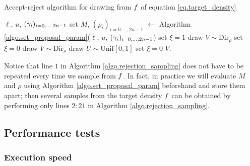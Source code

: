 \documentclass[10pt]{article}
\begin{document}
\begin{algorithm}
 \caption{Accept-reject algorithm for drawing from $f$ of equation \eqref{eq.target_density}}
 \label{algo.rejection_sampling}
 \begin{algorithmic}[5]
  \REQUIRE $\ell$, $u$, $(\gamma_i)_{i=0,\dots,2n-1}$
  \STATE set $M$, $(\rho_i)_{i=0,\dots,2n-1}$ $\leftarrow$ Algorithm \ref{algo.set_proposal_param}($\ell$, $u$, $(\gamma_i)_{i=0,\dots,2n-1}$)
  \STATE set $\xi = 1$
  \STATE draw $V\sim\text{Dir}_{\rho}$
  \STATE set $\xi=0$
  \ENDIF
  \ENDWHILE
  \ELSE
  \STATE draw $V\sim\text{Dir}_{\rho}$
  \STATE draw $U\sim \text{Unif}[0,1]$
  \STATE set $\xi = 0$
  \ENDIF
  \ENDIF
  \ENDWHILE
  \ENDIF
  \RETURN $V$.
 \end{algorithmic}
\end{algorithm}
\begin{remark}
 Notice that line $1$ in Algorithm \ref{algo.rejection_sampling} does not have to be repeated every time we sample from $f$. In fact, in practice we will evaluate  $M$ and $\rho$ using Algorithm \ref{algo.set_proposal_param} beforehand and store them apart; then several samples from the target density $f$ can be obtained by performing only lines $2:21$ in Algorithm \ref{algo.rejection_sampling}.
\end{remark}



\newpage

\subsection{Performance tests}
\subsubsection{Execution speed}
\end{document}
